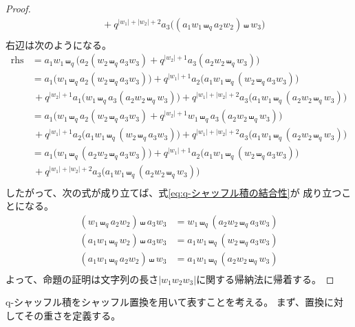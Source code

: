 {\begin{proof}
\begin{equation*}
\begin{split}
		&\,+ q^{|w_1|+|w_2|+2}
			a_3 \bigl((a_1w_1\shuffle_qa_2w_2)\shuffle w_3\bigr) \\
	\end{split}\end{equation*}
	右辺は次のようになる。
	\begin{equation*}\begin{split}
		\text{rhs} &= a_1w_1\shuffle_q\bigl(a_2(w_2\shuffle_qa_3w_3) 
			+ q^{|w_2|+1} a_3(a_2w_2\shuffle_qw_3)\bigr) \\
		&= a_1\bigl(w_1\shuffle_qa_2(w_2\shuffle_qa_3w_3)\bigr)
			+ q^{|w_1|+1} a_2\bigl(a_1w_1\shuffle_q(w_2\shuffle_qa_3w_3)\bigr) \\
		&\,+ q^{|w_2|+1}
			a_1 \bigl(w_1\shuffle_qa_3(a_2w_2\shuffle_qw_3)\bigr)
			+ q^{|w_1|+|w_2|+2}
			a_3 \bigl(a_1w_1\shuffle_q(a_2w_2\shuffle_qw_3)\bigr) \\
		&= a_1\bigl(w_1\shuffle_qa_2(w_2\shuffle_qa_3w_3)
			+ q^{|w_2|+1} w_1\shuffle_qa_3(a_2w_2\shuffle_qw_3)\bigr) \\
		&\,+ q^{|w_1|+1} a_2\bigl(a_1w_1\shuffle_q(w_2\shuffle_qa_3w_3)\bigr)
			+ q^{|w_1|+|w_2|+2}
			a_3 \bigl(a_1w_1\shuffle_q(a_2w_2\shuffle_qw_3)\bigr) \\
		&= a_1\bigl(w_1\shuffle_q(a_2w_2\shuffle_qa_3w_3)\bigr)
			+ q^{|w_1|+1} a_2\bigl(a_1w_1\shuffle_q(w_2\shuffle_qa_3w_3)\bigr) \\
		&\,+ q^{|w_1|+|w_2|+2}
			a_3 \bigl(a_1w_1\shuffle_q(a_2w_2\shuffle_qw_3)\bigr) \\
	\end{split}\end{equation*}
	したがって、次の式が成り立てば、式\eqref{eq:q-シャッフル積の結合性}が
	成り立つことになる。
	\begin{equation*}\begin{split}
		(w_1\shuffle_qa_2w_2)\shuffle a_3w_3
			&= w_1\shuffle_q(a_2w_2\shuffle_qa_3w_3) \\
		(a_1w_1\shuffle_qw_2)\shuffle a_3w_3
			&= a_1w_1\shuffle_q(w_2\shuffle_qa_3w_3) \\
		(a_1w_1\shuffle_qa_2w_2)\shuffle w_3
			&= a_1w_1\shuffle_q(a_2w_2\shuffle_qw_3) \\
	\end{split}\end{equation*}
	よって、命題の証明は文字列の長さ$|w_1w_2w_3|$に関する帰納法に帰着する。
	\end{proof}

	q-シャッフル積をシャッフル置換を用いて表すことを考える。
	まず、置換に対してその重さを定義する。

}

